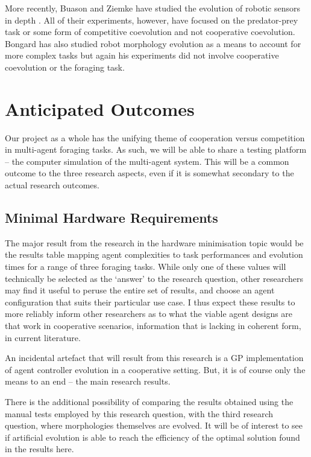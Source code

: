 \documentclass[a4paper,12pt]{article}
\begin{document}
More recently, Buason and Ziemke have studied the evolution of robotic sensors in depth \cite{Buason:2003, Buason:2005}. All of their experiments, however, have focused on the predator-prey task or some form of competitive coevolution and not cooperative coevolution. Bongard has also studied robot morphology evolution as a means to account for more complex tasks \cite{Bongard:2009,Bongard:2010} but again his experiments did not involve cooperative coevolution or the foraging task.

\section{Anticipated Outcomes}
Our project as a whole has the unifying theme of cooperation versus competition in multi-agent foraging tasks. As such, we will be able to share a testing platform -- the computer simulation of the multi-agent system. This will be a common outcome to the three research aspects, even if it is somewhat secondary to the actual research outcomes.

\subsection{Minimal Hardware Requirements}
The major result from the research in the hardware minimisation topic would be the results table mapping agent complexities to task performances and evolution times for a range of three foraging tasks. While only one of these values will technically be selected as the ‘answer’ to the research question, other researchers may find it useful to peruse the entire set of results, and choose an agent configuration that suits their particular use case.
I thus expect these results to more reliably inform other researchers as to what the viable agent designs are that work in cooperative scenarios, information that is lacking in coherent form, in current literature.

An incidental artefact that will result from this research is a GP implementation of agent controller evolution in a cooperative setting. But, it is of course only the means to an end -- the main research results.

There is the additional possibility of comparing the results obtained using the manual tests employed by this research question, with the third research question, where morphologies themselves are evolved. It will be of interest to see if artificial evolution is able to reach the efficiency of the optimal solution found in the results here.
\end{document}
